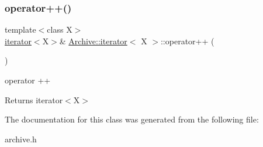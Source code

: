 \subsubsection{\texorpdfstring{operator++()}{operator++()}}
{\footnotesize\ttfamily template$<$class X$>$ \\
\hyperlink{class_archive_1_1iterator}{iterator}$<$X$>$\& \hyperlink{class_archive_1_1iterator}{Archive\+::iterator}$<$ X $>$\+::operator++ (\begin{DoxyParamCaption}{ }\end{DoxyParamCaption})\hspace{0.3cm}{\ttfamily [inline]}}



operator ++ 

\begin{DoxyReturn}{Returns}
iterator$<$\+X$>$ 
\end{DoxyReturn}


The documentation for this class was generated from the following file\+:\begin{DoxyCompactItemize}
\item 
archive.\+h\end{DoxyCompactItemize}
